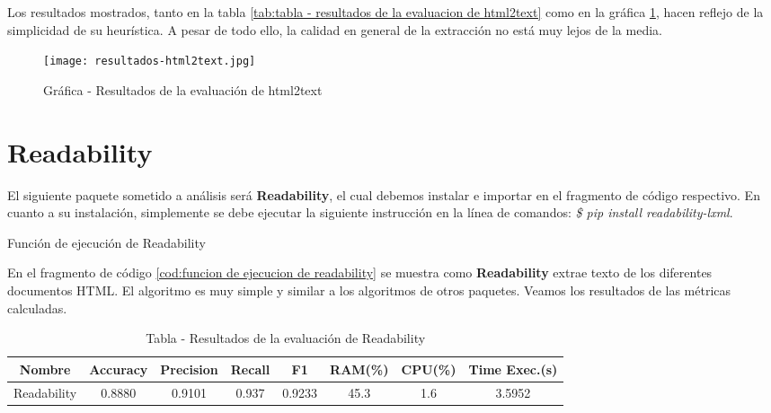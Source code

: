Los resultados mostrados, tanto en la tabla \ref{tab:tabla - resultados de la evaluacion de html2text} como
en la gráfica \ref{img:grafica - resultados de la evaluacion de html2text}, hacen reflejo de la simplicidad
de su heurística. A pesar de todo ello, la calidad en general de la extracción no está muy lejos de la media.

\begin{figure}[tphb]
    \centering
    \texttt{[image: resultados-html2text.jpg]}
    \caption{Gráfica - Resultados de la evaluación de html2text}
    \label{img:grafica - resultados de la evaluacion de html2text}
\end{figure}

\section*{Readability}

El siguiente paquete sometido a análisis será \textbf{Readability}, el cual debemos instalar e importar 
en el fragmento de código respectivo. En cuanto a su instalación, simplemente se debe ejecutar la siguiente 
instrucción en la línea de comandos: \emph{\$ pip install readability-lxml}.

\begin{codefloat}
    
    \caption{Función de ejecución de Readability}
    \label{cod:funcion de ejecucion de readability}
\end{codefloat}

En el fragmento de código \ref{cod:funcion de ejecucion de readability} se muestra como \textbf{Readability}
extrae texto de los diferentes documentos HTML. El algoritmo es muy simple y similar a los algoritmos de
otros paquetes. Veamos los resultados de las métricas calculadas.

\begin{table}[h]
    \begin{center}
      \begin{tabular}{| c | c | c | c | c | c | c | c |} \hline 
       \textbf{Nombre} & \textbf{Accuracy} & \textbf{Precision}  & \textbf{Recall} & \textbf{F1} & \textbf{RAM(\%)} & \textbf{CPU(\%)} & \textbf{Time Exec.(s)} \\ \hline
       Readability & 0.8880 & 0.9101 & 0.937 & 0.9233 & 45.3 & 1.6 & 3.5952 \\ \hline
      \end{tabular}
      \caption{Tabla - Resultados de la evaluación de Readability}
      \label{tab:tabla - resultados de la evaluacion de readability}
    \end{center}
\end{table}

